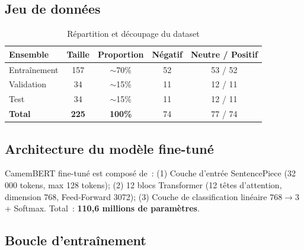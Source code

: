 \documentclass[12pt,a4paper,oneside]{report}
\begin{document}
\subsection{Jeu de données}

\begin{table}[H]
\centering
\caption{Répartition et découpage du dataset}
\label{tab:dataset}
\renewcommand{\arraystretch}{1.4}
\begin{tabular}{lcccc}
\toprule
\rowcolor{bleuprincipal!15}
\textbf{Ensemble} & \textbf{Taille} & \textbf{Proportion} & \textbf{Négatif} & \textbf{Neutre / Positif} \\
\midrule
Entraînement & 157 & $\sim$70\% & 52 & 53 / 52 \\
\rowcolor{gray!8}
Validation & 34 & $\sim$15\% & 11 & 12 / 11 \\
Test & 34 & $\sim$15\% & 11 & 12 / 11 \\
\midrule
\rowcolor{bleuprincipal!8}
\textbf{Total} & \textbf{225} & \textbf{100\%} & 74 & 77 / 74 \\
\bottomrule
\end{tabular}
\end{table}

\subsection{Architecture du modèle fine-tuné}

CamemBERT fine-tuné est composé de~: (1) Couche d'entrée SentencePiece
(32\,000 tokens, max 128 tokens); (2) 12 blocs Transformer (12 têtes
d'attention, dimension 768, Feed-Forward 3072); (3) Couche de classification
linéaire $768\rightarrow 3$ + Softmax. Total~: \textbf{110,6 millions de
paramètres}.

\subsection{Boucle d'entraînement}
\end{document}
